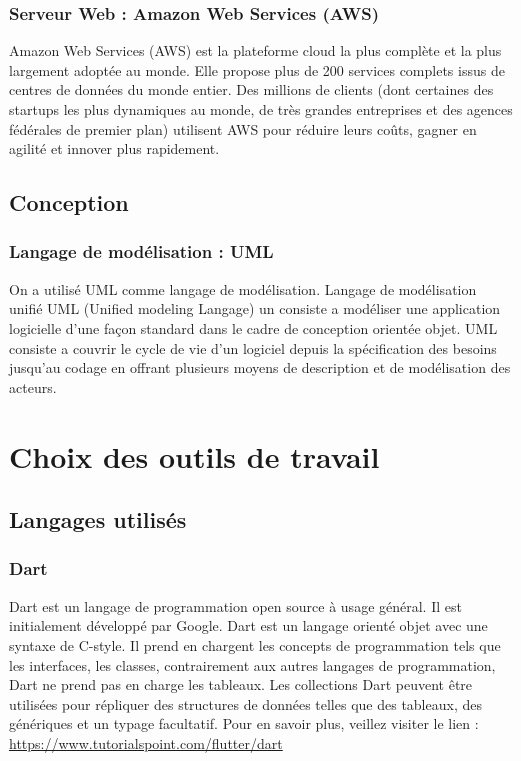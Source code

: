 \subsubsection{Serveur Web : Amazon Web Services (AWS)}
Amazon Web Services (AWS) est la plateforme cloud la plus complète et la plus largement adoptée au monde. Elle propose plus de 200 services complets issus de centres de données du monde entier. Des millions de clients (dont certaines des startups les plus dynamiques au monde, de très grandes entreprises et des agences fédérales de premier plan) utilisent AWS pour réduire leurs coûts, gagner en agilité et innover plus rapidement.

\subsection{Conception}
\subsubsection{Langage de modélisation : UML}
On a utilisé UML comme langage de modélisation.
Langage de modélisation unifié UML (Unified modeling Langage) un
consiste a modéliser une application logicielle d'une façon standard
dans le cadre de conception orientée objet.
UML consiste a couvrir le cycle de vie d'un logiciel depuis la
spécification des besoins jusqu'au codage en offrant plusieurs
moyens de description et de modélisation des acteurs.





\section{Choix des outils de travail }
\subsection{Langages utilisés}
\subsubsection{Dart}
Dart est un langage de programmation open source à usage général. Il est initialement développé par Google. Dart est un langage orienté objet avec une syntaxe de C-style. Il prend en chargent les concepts de programmation tels que les interfaces, les classes, contrairement aux autres langages de programmation, Dart ne prend pas en charge les tableaux.
Les collections Dart peuvent être utilisées pour répliquer des structures de données telles que des tableaux, des génériques et un typage facultatif.
\newline Pour en savoir plus, veillez
visiter le lien : \href{https://www.tutorialspoint.com/flutter/flutter_introduction_to_dart_programming.htm}{https://www.tutorialspoint.com/flutter/dart}
